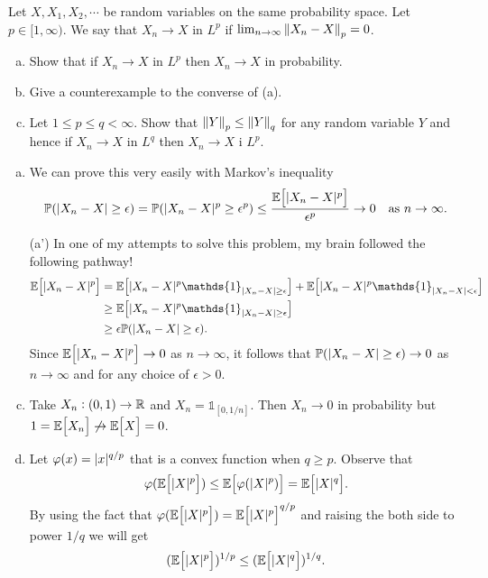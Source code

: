 \begin{problem}
	Let $ X,X_1,X_2,\cdots $ be random variables on the same probability space. Let $ p\in[1,\infty) $. We say that $ X_n \to X $ in $ L^p $ if $ \lim_{n\to\infty}\norm{X_n - X}_p  = 0$.
	\begin{enumerate}[(a)]
		\item Show that if $ X_n \to X $ in $ L^p $ then $ X_n \to X $ in probability. 
		\item Give a counterexample to the converse of (a).
		\item Let $ 1 \leq p \leq q <\infty $. Show that $ \norm{Y}_p \leq \norm{Y}_q $ for any random variable $ Y $ and hence if $ X_n\to X $ in $ L^q $ then $ X_n\to X $ i $ L^p $.
	\end{enumerate}
\end{problem}
\begin{solution}
	\begin{enumerate}[(a)]
		\item We can prove this very easily with Markov's inequality
		\[ \mathbb{P}(|X_n - X| \geq \epsilon) = \mathbb{P}(|X_n - X|^p \geq \epsilon^p ) \leq \frac{\mathbb{E}\big[|X_n - X|^p\big]}{\epsilon^p} \to 0 \quad \text{as $ n\to\infty $}. \]
		
		\item [(a')] In one of my attempts to solve this problem, my brain followed the following pathway!
		\begin{align*}
			\E{\abs{X_n-X}^p} &= \E{\abs{X_n - X}^p\mathds{1}_{\abs{X_n-X}\geq \epsilon}} + \E{\abs{X_n-X}^p \mathds{1}_{\abs{X_n-X}<\epsilon}} \\
			& \geq  \E{\abs{X_n - X}^p\mathds{1}_{\abs{X_n-X}\geq \epsilon}} \\
			& \geq \epsilon\prob(\abs{X_n-X}\geq \epsilon).
		\end{align*}
		Since $ \mathbb{E}\big[|X_n-X|^p\big]\to 0 $ as $ n\to\infty $, it follows that $ \mathbb{P}(|X_n - X|\geq \epsilon) \to 0 $ as $ n\to\infty $ and for any choice of $ \epsilon>0 $.
		
		\item Take $ X_n: (0,1) \to\mathbb{R} $ and $ X_n = \mathds{1}_{[0,1/n]} $. Then $ X_n \to 0 $ in probability but $ 1 = \mathbb{E}\big[X_n\big] \not\to \mathbb{E}\big[X\big] = 0 $.
		
		\item Let $ \varphi(x) = |x|^{q/p} $ that is a convex function when $ q\geq p $. Observe that
		\[ \varphi(\mathbb{E}\big[|X|^p\big]) \leq \mathbb{E}\big[\varphi(|X|^p)\big] = \mathbb{E}\big[|X|^q\big]. \] 
		By using the fact that $ \varphi(\mathbb{E}\big[|X|^p\big]) = \mathbb{E}\big[|X|^p\big]^{q/p} $ and raising the both side to power $ 1/q $ we will get
		\[ (\mathbb{E}\big[|X|^p\big])^{1/p} \leq (\mathbb{E}\big[|X|^q\big])^{1/q}. \]
	\end{enumerate}
\end{solution}

